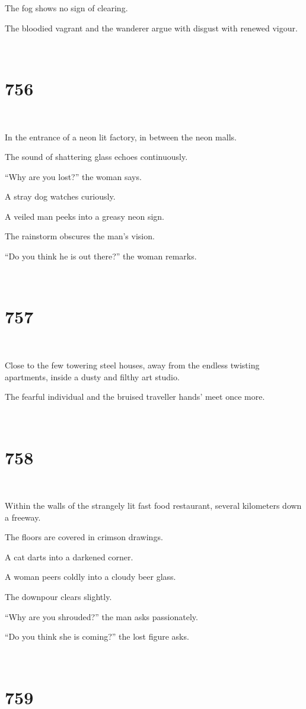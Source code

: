 \documentclass{report}
\begin{document}
The fog shows no sign of clearing.

The bloodied vagrant and the wanderer argue with disgust with renewed vigour.

~
\chapter*{756}
~

In the entrance of a neon lit factory, in between the neon malls.

The sound of shattering glass echoes continuously.

``Why are you lost?'' the woman says.

A stray dog watches curiously.

A veiled man peeks into a greasy neon sign.

The rainstorm obscures the man's vision.

``Do you think he is out there?'' the woman remarks.

~
\chapter*{757}
~

Close to the few towering steel houses, away from the endless twisting apartments, inside a dusty and filthy art studio.

The fearful individual and the bruised traveller hands' meet once more.

~
\chapter*{758}
~

Within the walls of the strangely lit fast food restaurant, several kilometers down a freeway.

The floors are covered in crimson drawings.

A cat darts into a darkened corner.

A woman peers coldly into a cloudy beer glass.

The downpour clears slightly.

``Why are you shrouded?'' the man asks passionately.

``Do you think she is coming?'' the lost figure asks.

~
\chapter*{759}
~
\end{document}
